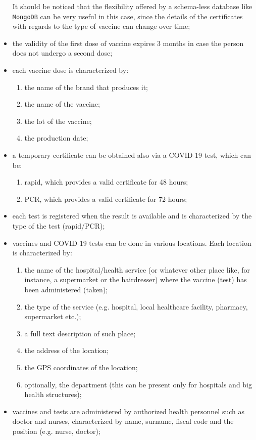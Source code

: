\documentclass{article}
\begin{document}
\begin{itemize}
\begin{enumerate}
\end{enumerate}
It should be noticed that the flexibility offered by a schema-less database like \verb|MongoDB| can be very useful in this case, since the details of the certificates with regards to the type of vaccine can change over time;
\item the validity of the first dose of vaccine expires 3 months in case the person does not undergo a second dose;
\item each vaccine dose is characterized by:
\begin{enumerate}
    \item the name of the brand that produces it;
    \item the name of the vaccine;
    \item the lot of the vaccine;
    \item the production date;
\end{enumerate}
\item a temporary certificate can be obtained also via a COVID-19 test, which can be:
\begin{enumerate}
    \item rapid, which provides a valid certificate for 48 hours;
    \item PCR, which provides a valid certificate for 72 hours;
    \end{enumerate}
\item each test is registered when the result is available and is characterized by the type of the test (rapid/PCR);
\item vaccines and COVID-19 tests can be done in various locations. Each location is characterized by:
\begin{enumerate}
    \item the name of the hospital/health service (or whatever other place like, for instance, a supermarket or the hairdresser) where the vaccine (test) has been administered (taken);
    \item the type of the service (e.g. hospital, local healthcare facility, pharmacy, supermarket etc.);
    \item a full text description of such place;
    \item the address of the location;
    \item the GPS coordinates of the location;
    \item optionally, the department (this can be present only for hospitals and big health structures);
\end{enumerate}
\item vaccines and tests are administered by authorized health personnel such as doctor and nurses, characterized by name, surname, fiscal code and the position (e.g. nurse, doctor);

\end{itemize}
\end{document}
